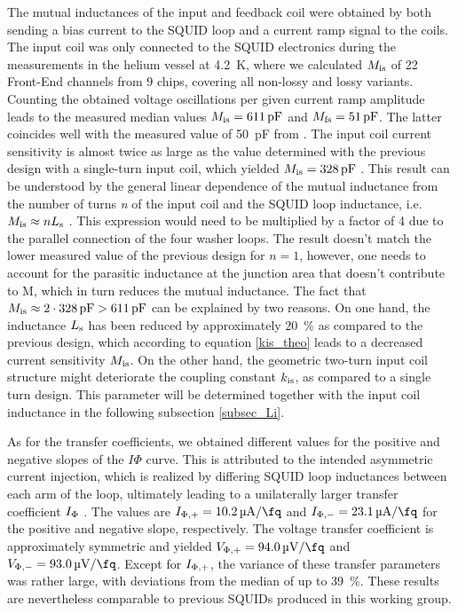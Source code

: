 The mutual inductances of the input and feedback coil were obtained by both sending a bias current to the SQUID loop and a current ramp signal to the coils. The input coil was only connected to the SQUID electronics during the measurements in the helium vessel at \qty{4.2}{\kelvin}, where we calculated $M_{\rm is}$ of 22 Front-End channels from 9 chips, covering all non-lossy and lossy variants. Counting the obtained voltage oscillations per given current ramp amplitude leads to the measured median values $M_{\rm is}=\qty{611}{\pico\farad}$ and $M_{\rm fs}=\qty{51}{\pico\farad}$. The latter coincides well with the measured value of \qty{50}{\pico\farad} from \cite{Bauer2022}. The input coil current sensitivity is almost twice as large as the value determined with the previous design with a single-turn input coil, which yielded $M_{\rm is}=\qty{328}{\pico\farad}$ \cite{Bauer2022}. This result can be understood by the general linear dependence of the mutual inductance from the number of turns \textit{n} of the input coil and the SQUID loop inductance, i.e. $M_{\rm is}\approx nL_{\rm s}$ \cite{Ketchen1981}. This expression would need to be multiplied by a factor of 4 due to the parallel connection of the four washer loops. The result doesn't match the lower measured value of the previous design for $n=1$, however, one needs to account for the parasitic inductance at the junction area that doesn't contribute to M, which in turn reduces the mutual inductance. The fact that $M_{\rm is}\approx 2\cdot \qty{328}{\pico\farad}>\qty{611}{\pico\farad}$ can be explained by two reasons. On one hand, the inductance $L_{\rm s}$ has been reduced by approximately \qty{20}{\percent} as compared to the previous design, which according to equation \ref{kis_theo} leads to a decreased current sensitivity $M_{\rm is}$. On the other hand, the geometric two-turn input coil structure might deteriorate the coupling constant $k_{\rm is}$, as compared to a single turn design. This parameter will be determined together with the input coil inductance in the following subsection \ref{subsec_Li}.

As for the transfer coefficients, we obtained different values for the positive and negative slopes of the $I\Phi$ curve. This is attributed to the intended asymmetric current injection, which is realized by differing SQUID loop inductances between each arm of the loop, ultimately leading to a unilaterally larger transfer coefficient $I_{\rm \Phi}$ \cite{Ferring2015}. The values are $I_{\rm \Phi,+}=\qty{10.2}{\micro\ampere\per\fq}$ and $I_{\rm \Phi,-}=\qty{23.1}{\micro\ampere\per\fq}$ for the positive and negative slope, respectively. The voltage transfer coefficient is approximately symmetric and yielded $V_{\rm \Phi,+}=\qty{94.0}{\micro\volt\per\fq}$ and $V_{\rm \Phi,-}=\qty{93.0}{\micro\volt\per\fq}$. Except for $I_{\rm \Phi,+}$, the variance of these transfer parameters was rather large, with deviations from the median of up to \qty{39}{\percent}. These results are nevertheless comparable to previous SQUIDs produced in this working group.      


